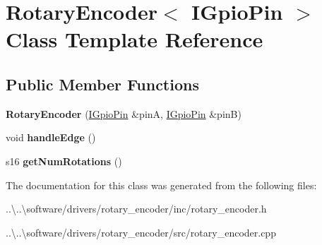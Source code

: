 \hypertarget{class_rotary_encoder}{}\section{Rotary\+Encoder$<$ I\+Gpio\+Pin $>$ Class Template Reference}
\label{class_rotary_encoder}
\subsection*{Public Member Functions}
\begin{DoxyCompactItemize}
\item 
\mbox{\label{class_rotary_encoder_a4dd277ba00fe46063f5778b202fa8414}} 
{\bfseries Rotary\+Encoder} (\mbox{\hyperlink{class_i_gpio_pin}{I\+Gpio\+Pin}} \&pinA, \mbox{\hyperlink{class_i_gpio_pin}{I\+Gpio\+Pin}} \&pinB)
\item 
\mbox{\label{class_rotary_encoder_af2d26ccf013052b3f223e40e0b4d6a9e}} 
void {\bfseries handle\+Edge} ()
\item 
\mbox{\label{class_rotary_encoder_aa5e3039a73f78b6c323f061e03dd0f8d}} 
s16 {\bfseries get\+Num\+Rotations} ()
\end{DoxyCompactItemize}


The documentation for this class was generated from the following files\+:\begin{DoxyCompactItemize}
\item 
..\textbackslash{}..\textbackslash{}software/drivers/rotary\+\_\+encoder/inc/rotary\+\_\+encoder.\+h\item 
..\textbackslash{}..\textbackslash{}software/drivers/rotary\+\_\+encoder/src/rotary\+\_\+encoder.\+cpp\end{DoxyCompactItemize}
